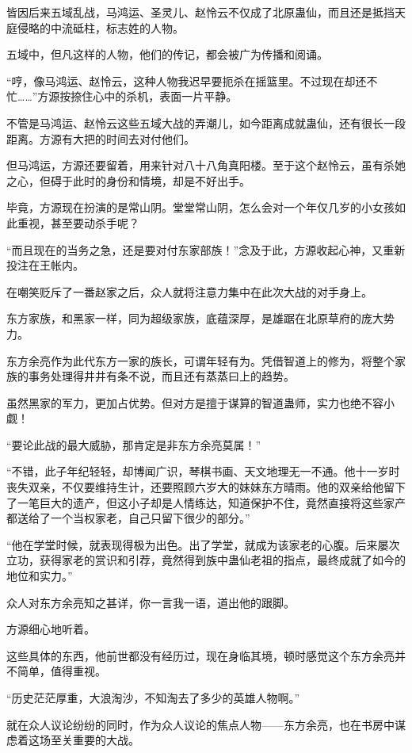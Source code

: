 \begin{this_body}
皆因后来五域乱战，马鸿运、圣灵儿、赵怜云不仅成了北原蛊仙，而且还是抵挡天庭侵略的中流砥柱，标志姓的人物。

五域中，但凡这样的人物，他们的传记，都会被广为传播和阅诵。

“哼，像马鸿运、赵怜云，这种人物我迟早要扼杀在摇篮里。不过现在却还不忙……”方源按捺住心中的杀机，表面一片平静。

不管是马鸿运、赵怜云这些五域大战的弄潮儿，如今距离成就蛊仙，还有很长一段距离。方源有大把的时间去对付他们。

但马鸿运，方源还要留着，用来针对八十八角真阳楼。至于这个赵怜云，虽有杀她之心，但碍于此时的身份和情境，却是不好出手。

毕竟，方源现在扮演的是常山阴。堂堂常山阴，怎么会对一个年仅几岁的小女孩如此重视，甚至要动杀手呢？

“而且现在的当务之急，还是要对付东家部族！”念及于此，方源收起心神，又重新投注在王帐内。

在嘲笑贬斥了一番赵家之后，众人就将注意力集中在此次大战的对手身上。

东方家族，和黑家一样，同为超级家族，底蕴深厚，是雄踞在北原草府的庞大势力。

东方余亮作为此代东方一家的族长，可谓年轻有为。凭借智道上的修为，将整个家族的事务处理得井井有条不说，而且还有蒸蒸曰上的趋势。

虽然黑家的军力，更加占优势。但对方是擅于谋算的智道蛊师，实力也绝不容小觑！

“要论此战的最大威胁，那肯定是非东方余亮莫属！”

“不错，此子年纪轻轻，却博闻广识，琴棋书画、天文地理无一不通。他十一岁时丧失双亲，不仅要维持生计，还要照顾六岁大的妹妹东方晴雨。他的双亲给他留下了一笔巨大的遗产，但这小子却是人情练达，知道保护不住，竟然直接将这些家产都送给了一个当权家老，自己只留下很少的部分。”

“他在学堂时候，就表现得极为出色。出了学堂，就成为该家老的心腹。后来屡次立功，获得家老的赏识和引荐，竟然得到族中蛊仙老祖的指点，最终成就了如今的地位和实力。”

众人对东方余亮知之甚详，你一言我一语，道出他的跟脚。

方源细心地听着。

这些具体的东西，他前世都没有经历过，现在身临其境，顿时感觉这个东方余亮并不简单，值得重视。

“历史茫茫厚重，大浪淘沙，不知淘去了多少的英雄人物啊。”

就在众人议论纷纷的同时，作为众人议论的焦点人物——东方余亮，也在书房中谋虑着这场至关重要的大战。


\end{this_body}
